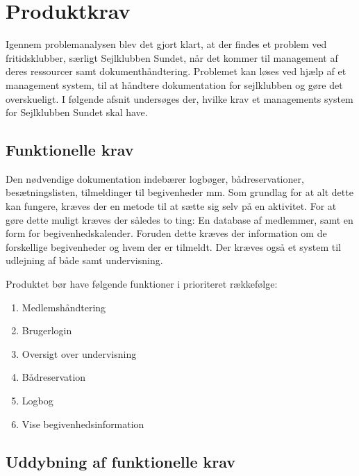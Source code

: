 \chapter{Produktkrav}

Igennem problemanalysen blev det gjort klart, at der findes et problem ved fritidsklubber, særligt Sejlklubben Sundet, når det kommer til management af deres ressourcer samt dokumenthåndtering. 
Problemet kan løses ved hjælp af et management system, til at håndtere dokumentation for sejlklubben og gøre det overskueligt. 
I følgende afsnit undersøges der, hvilke krav et managements system for Sejlklubben Sundet skal have. 


\section{Funktionelle krav} \label{sec:funktionelleKrav}

Den nødvendige dokumentation indebærer logbøger, bådreservationer, besætningslisten, tilmeldinger til begivenheder mm. 
Som grundlag for at alt dette kan fungere, kræves der en metode til at sætte sig selv på en aktivitet. 
For at gøre dette muligt kræves der således to ting: En database af medlemmer, samt en form for begivenhedskalender.
Foruden dette kræves der information om de forskellige begivenheder og hvem der er tilmeldt. 
Der kræves også et system til udlejning af både samt undervisning.

Produktet bør have følgende funktioner i prioriteret rækkefølge:
\begin{enumerate}
  \item Medlemshåndtering
  \item Brugerlogin
  \item Oversigt over undervisning 
  \item Bådreservation
  \item Logbog
  \item Vise begivenhedsinformation 
\end{enumerate}



\section{Uddybning af funktionelle krav}


